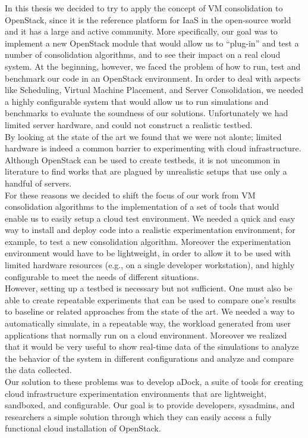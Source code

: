 In this thesis we decided to try to apply the concept of VM consolidation to OpenStack, since it is the reference platform for IaaS in the open-source world and it has a large and active community. More specifically, our goal was to implement a new OpenStack module that would allow us to ``plug-in'' and test a number of consolidation algorithms, and to see their impact on a real cloud system. At the beginning, however, we faced the problem of how to run, test and benchmark our code in an OpenStack environment. In order to deal with aspects like Scheduling, Virtual Machine Placement, and Server Consolidation, we needed a highly configurable system that would allow us to run simulations and benchmarks to evaluate the soundness of our solutions. Unfortunately we had limited server hardware, and could not construct a realistic testbed.\\
By looking at the state of the art we found that we were not alonte; limited hardware is indeed a common barrier to experimenting with cloud infrastructure. Although OpenStack can be used to create testbeds, it is not uncommon in literature to find works that are plagued by unrealistic setups that use only a handful of servers.\\
For these reasons we decided to shift the focus of our work from VM consolidation algorithms to the implementation of a set of tools that would enable us to easily setup a cloud test environment. We needed a quick and easy way to install and deploy code into a realistic experimentation environment, for example, to test a new consolidation algorithm. Moreover the experimentation environment would have to be lightweight, in order to allow it to be used with limited hardware resources (e.g., on a single developer workstation), and highly configurable to meet the needs of different situations.\\
However, setting up a testbed is necessary but not sufficient. One must also be able to create repeatable experiments that can be used to compare one’s results to baseline or related approaches from the state of the art. We needed a way to automatically simulate, in a repeatable way, the workload generated from user applications that normally run on a cloud environment. Moreover we realized that it would be very useful to show real-time data of the simulations to analyze the behavior of the system in different configurations and analyze and compare the data collected.\\
Our solution to these problems was to develop aDock, a suite of tools for creating cloud infrastructure experimentation environments that are lightweight, sandboxed, and configurable. Our goal is to provide developers, sysadmins, and researchers a simple solution through which they can easily access a fully functional cloud installation of OpenStack.\\
